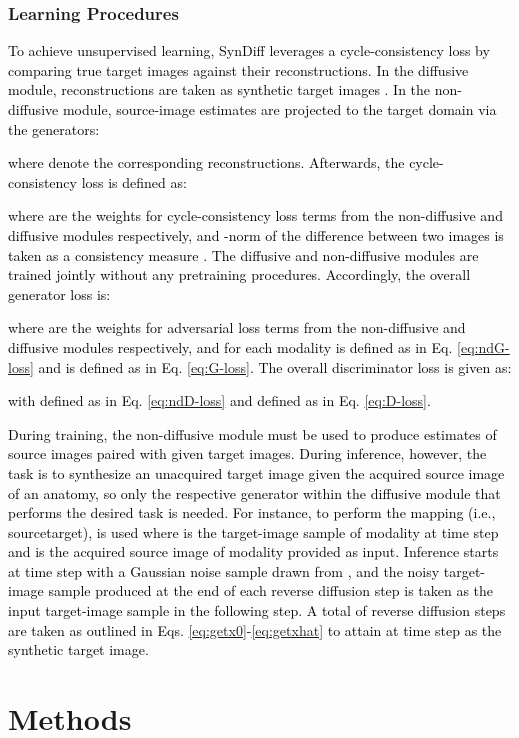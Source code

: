 \documentclass[journal,twoside,web]{ieeecolor}
\newcommand*{\revhl}{\textcolor{black}}
\begin{document}
\vspace{-0.5cm}
\subsubsection{Learning Procedures}
\revhl{To achieve unsupervised learning, SynDiff leverages a cycle-consistency loss by comparing true target images against their reconstructions. In the diffusive module, reconstructions are taken as synthetic target images . In the non-diffusive module, source-image estimates are projected to the target domain via the generators:

where  denote the corresponding reconstructions. Afterwards, the cycle-consistency loss is defined as:

where  are the weights for cycle-consistency loss terms from the non-diffusive and diffusive modules respectively, and -norm of the difference between two images is taken as a consistency measure \cite{dar2019image}. The diffusive and non-diffusive modules are trained jointly without any pretraining procedures. Accordingly, the overall generator loss is:

where  are the weights for adversarial loss terms from the non-diffusive and diffusive modules respectively, and for each modality  is defined as in Eq. \ref{eq:ndG-loss} and  is defined as in Eq. \ref{eq:G-loss}. The overall discriminator loss is given as:

with  defined as in Eq. \ref{eq:ndD-loss} and  defined as in Eq. \ref{eq:D-loss}.}

\revhl{During training, the non-diffusive module must be used to produce estimates of source images paired with given target images. During inference, however, the task is to synthesize an unacquired target image given the acquired source image of an anatomy, so only the respective generator within the diffusive module that performs the desired task is needed. For instance, to perform the mapping  (i.e., sourcetarget),  is used where  is the target-image sample of modality  at time step  and  is the acquired source image of modality  provided as input. Inference starts at time step  with a Gaussian noise sample  drawn from , and the noisy target-image sample produced at the end of each reverse diffusion step is taken as the input target-image sample in the following step. A total of  reverse diffusion steps are taken as outlined in Eqs. \ref{eq:getx0}-\ref{eq:getxhat} to attain  at time step  as the synthetic target image.}

\section{Methods}
\end{document}
